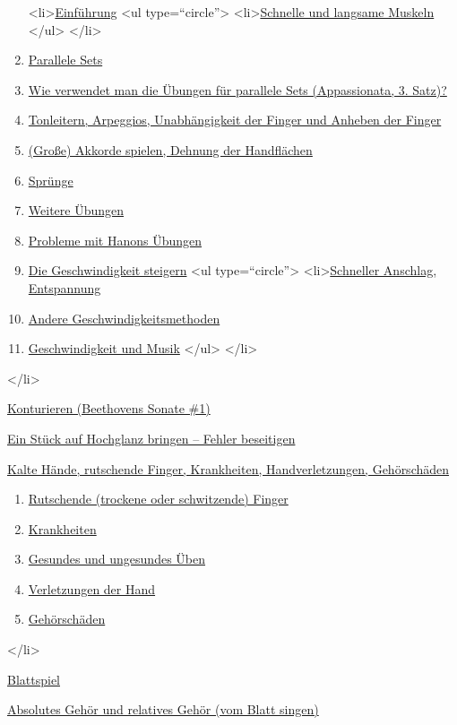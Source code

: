   \begin{enumerate}[label={\alph*.}] 
   <li>\hyperref[c1iii7a]{Einführung}
    <ul type=\enquote{circle}>
      <li>\hyperref[c1iii7aMuskeln]{Schnelle und langsame Muskeln}
    </ul>
   </li> 
   \item \hyperref[c1iii7b]{Parallele Sets}
   \item \hyperref[c1iii7c]{Wie verwendet man die Übungen für parallele Sets (Appassionata, 3. Satz)?}
   \item \hyperref[c1iii7d]{Tonleitern, Arpeggios, Unabhängigkeit der Finger und Anheben der Finger}
   \item \hyperref[c1iii7e]{(Große) Akkorde spielen, Dehnung der Handflächen}
   \item \hyperref[c1iii7f]{Sprünge}
   \item \hyperref[c1iii7g]{Weitere Übungen}
   \item \hyperref[c1iii7h]{Probleme mit Hanons Übungen}
   \item \hyperref[c1iii7i]{Die Geschwindigkeit steigern}
    <ul type=\enquote{circle}>
     <li>\hyperref[c1iii7iAnschlag]{Schneller Anschlag, Entspannung}
     \item \hyperref[c1iii7iAndere]{Andere Geschwindigkeitsmethoden}
     \item \hyperref[c1iii7iMusik]{Geschwindigkeit und Musik}
    </ul>
   </li>
   \end{enumerate}
 </li>
 \item \hyperref[c1iii8]{Konturieren (Beethovens Sonate \#1)}
 \item \hyperref[c1iii9]{Ein Stück auf Hochglanz bringen -- Fehler beseitigen}
 \item \hyperref[c1iii10]{Kalte Hände, rutschende Finger, Krankheiten, Handverletzungen, Gehörschäden}
  \begin{enumerate}[label={\alph*.}] 
   <li>\hyperref[c1iii10]{Kalte Hände}
   \item \hyperref[c1iii10rutschen]{Rutschende (trockene oder schwitzende) Finger}
   \item \hyperref[c1iii10krank]{Krankheiten}
   \item \hyperref[c1iii10ungesund]{Gesundes und ungesundes Üben}
   \item \hyperref[c1iii10hand]{Verletzungen der Hand}
   \item \hyperref[c1iii10gehoer]{Gehörschäden}
   \end{enumerate}
 </li>
 \item \hyperref[c1iii11]{Blattspiel}
 \item \hyperref[c1iii12]{Absolutes Gehör und relatives Gehör (vom Blatt singen)}
